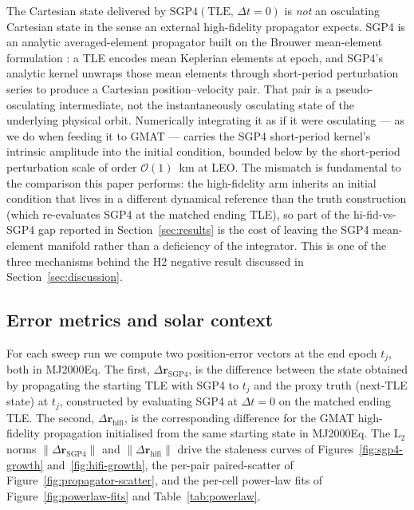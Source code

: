 \documentclass[10pt, letterpaper]{article}
\begin{document}
The Cartesian state delivered by $\mathrm{SGP4}(\mathrm{TLE},\,
\Delta t = 0)$ is \emph{not} an osculating Cartesian state in the
sense an external high-fidelity propagator expects. SGP4 is an
analytic averaged-element propagator built on the Brouwer
mean-element formulation \citep[\S\,11.6]{vallado2013}: a TLE
encodes mean Keplerian elements at epoch, and SGP4's analytic
kernel \citep{hoots2004} unwraps those mean elements through
short-period perturbation series to produce a Cartesian
position--velocity pair. That pair is a pseudo-osculating
intermediate, not the instantaneously osculating state of the
underlying physical orbit. Numerically integrating it as if it
were osculating --- as we do when feeding it to GMAT --- carries
the SGP4 short-period kernel's intrinsic amplitude into the
initial condition, bounded below by the short-period perturbation
scale of order $\mathcal{O}(1)$~km at LEO. The mismatch is
fundamental to the comparison this paper performs: the
high-fidelity arm inherits an initial condition that lives in a
different dynamical reference than the truth construction (which
re-evaluates SGP4 at the matched ending TLE), so part of the
hi-fid-vs-SGP4 gap reported in Section~\ref{sec:results} is the
cost of leaving the SGP4 mean-element manifold rather than a
deficiency of the integrator. This is one of the three mechanisms
behind the H2 negative result discussed in
Section~\ref{sec:discussion}.

\subsection{Error metrics and solar context}
\label{sec:methods-metrics}

For each sweep run we compute two position-error vectors at the end
epoch $t_{j}$, both in MJ2000Eq. The first,
$\Delta\mathbf{r}_{\mathrm{SGP4}}$, is the difference between the
state obtained by propagating the starting TLE with SGP4 to $t_{j}$
and the proxy truth (next-TLE state) at $t_{j}$, constructed by
evaluating SGP4 at $\Delta t = 0$ on the matched ending TLE. The
second, $\Delta\mathbf{r}_{\mathrm{hifi}}$, is the corresponding
difference for the GMAT high-fidelity propagation initialised from
the same starting state in MJ2000Eq. The L$_{2}$ norms
$\lVert\Delta\mathbf{r}_{\mathrm{SGP4}}\rVert$ and
$\lVert\Delta\mathbf{r}_{\mathrm{hifi}}\rVert$ drive the staleness
curves of Figures~\ref{fig:sgp4-growth} and~\ref{fig:hifi-growth},
the per-pair paired-scatter of
Figure~\ref{fig:propagator-scatter}, and the per-cell power-law
fits of Figure~\ref{fig:powerlaw-fits} and Table~\ref{tab:powerlaw}.
\end{document}
